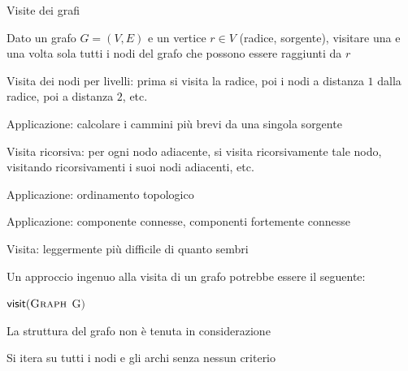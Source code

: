 \begin{frame}{Visite dei grafi}

\vspace{-9pt}
\begin{myboxtitle}
Dato un grafo $G=(V,E)$ e un vertice $r \in V$ (\alert{radice}, \alert{sorgente}), visitare una e una volta sola tutti i nodi del grafo che possono essere raggiunti da $r$
\end{myboxtitle}

\begin{overprint}
\begin{myboxtitle}
Visita dei nodi per livelli: prima si visita la radice, poi i nodi a distanza $1$ dalla radice, poi a distanza $2$, etc.
\BI
\item Applicazione: calcolare i cammini più brevi da una singola sorgente
\EI
\end{myboxtitle}

\begin{myboxtitle}
Visita ricorsiva: per ogni nodo adiacente, si visita ricorsivamente tale nodo, visitando ricorsivamenti i suoi nodi adiacenti, etc.

\BI
\item Applicazione: ordinamento topologico
\item Applicazione: componente connesse, componenti fortemente connesse
\EI
\end{myboxtitle}
\end{overprint}
\end{frame}


\begin{frame}{Visita: leggermente più difficile di quanto sembri}

Un approccio ingenuo alla visita di un grafo potrebbe essere il seguente:

\begin{Procedure}
\caption[A]{$\textsf{visit}(\Graph\ $G$)$}
\end{Procedure}

\BIL
\item La struttura del grafo non è tenuta in considerazione
\item Si itera su tutti i nodi e gli archi senza nessun criterio
\EIL

\end{frame}


